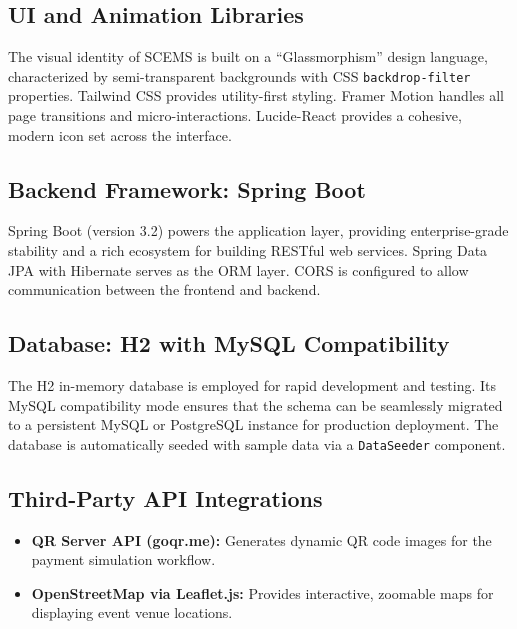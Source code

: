 \documentclass[12pt,a4paper]{report}
\begin{document}
\subsection{UI and Animation Libraries}
The visual identity of SCEMS is built on a ``Glassmorphism'' design language, characterized by semi-transparent backgrounds with CSS \texttt{backdrop-filter} properties. Tailwind CSS provides utility-first styling. Framer Motion handles all page transitions and micro-interactions. Lucide-React provides a cohesive, modern icon set across the interface.

\subsection{Backend Framework: Spring Boot}
Spring Boot (version 3.2) powers the application layer, providing enterprise-grade stability and a rich ecosystem for building RESTful web services. Spring Data JPA with Hibernate serves as the ORM layer. CORS is configured to allow communication between the frontend and backend.

\subsection{Database: H2 with MySQL Compatibility}
The H2 in-memory database is employed for rapid development and testing. Its MySQL compatibility mode ensures that the schema can be seamlessly migrated to a persistent MySQL or PostgreSQL instance for production deployment. The database is automatically seeded with sample data via a \texttt{DataSeeder} component.

\subsection{Third-Party API Integrations}
\begin{itemize}
    \item \textbf{QR Server API (goqr.me):} Generates dynamic QR code images for the payment simulation workflow.
    \item \textbf{OpenStreetMap via Leaflet.js:} Provides interactive, zoomable maps for displaying event venue locations.
\end{itemize}
\end{document}

